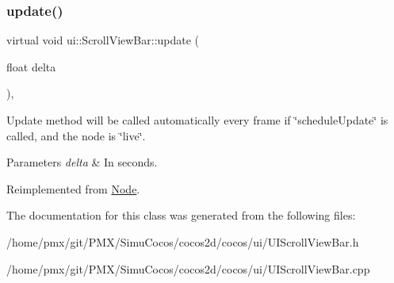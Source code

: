 \subsubsection{\texorpdfstring{update()}{update()}\hspace{0.1cm}{\footnotesize\ttfamily [2/2]}}
{\footnotesize\ttfamily virtual void ui\+::\+Scroll\+View\+Bar\+::update (\begin{DoxyParamCaption}\item[{float}]{delta }\end{DoxyParamCaption})\hspace{0.3cm}{\ttfamily [override]}, {\ttfamily [virtual]}}

Update method will be called automatically every frame if \char`\"{}schedule\+Update\char`\"{} is called, and the node is \char`\"{}live\char`\"{}. 
\begin{DoxyParams}{Parameters}
{\em delta} & In seconds. \\
\hline
\end{DoxyParams}


Reimplemented from \hyperlink{classNode_a32878481ba54b3856ab53c10af13848e}{Node}.



The documentation for this class was generated from the following files\+:\begin{DoxyCompactItemize}
\item 
/home/pmx/git/\+P\+M\+X/\+Simu\+Cocos/cocos2d/cocos/ui/U\+I\+Scroll\+View\+Bar.\+h\item 
/home/pmx/git/\+P\+M\+X/\+Simu\+Cocos/cocos2d/cocos/ui/U\+I\+Scroll\+View\+Bar.\+cpp\end{DoxyCompactItemize}
